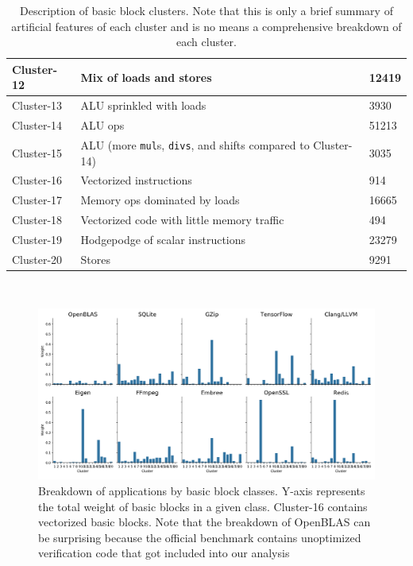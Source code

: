 \begin{table}
\begin{tabular}{|p{}|p{}|p{}|}
    Cluster-12 &
    Mix of loads and stores & 12419 \\
    \hline
    
    Cluster-13 &
    ALU sprinkled with loads & 3930 \\
    \hline
    
    Cluster-14 &
    ALU ops & 51213 \\
    \hline
    
    Cluster-15 &
    ALU (more \verb|mul|s, \verb|divs|, and shifts compared to Cluster-14) & 3035 \\
    \hline
    
    Cluster-16 &
    Vectorized instructions & 914 \\
    \hline
    
    Cluster-17 &
    Memory ops dominated by loads & 16665 \\
    \hline
    
    Cluster-18 &
    Vectorized code with little memory traffic & 494 \\
    \hline
    
    Cluster-19 &
    Hodgepodge of scalar instructions & 23279 \\
    \hline
    
    Cluster-20  &
    Stores & 9291\\
    \hline

\end{tabular}
\\
\caption{Description of basic block clusters. Note that this is only a brief
summary of artificial features of each cluster and is no means a comprehensive
breakdown of each cluster.}
\label{tab:clusters}

\end{table}

\begin{figure}[h]
\includegraphics[width=\textwidth]{figures/apps-vs-clusters.png}
\caption{Breakdown of applications by basic block classes.
Y-axis represents the total weight of basic blocks
in a given class.
Cluster-16 contains vectorized basic blocks.
Note that the breakdown of OpenBLAS can be surprising
because the official benchmark contains
unoptimized verification code that got included into
our analysis}
\label{fig:apps_vs_clusters}
\end{figure}
